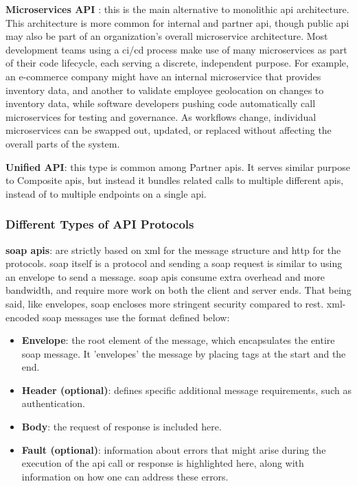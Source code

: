 \begin{multicols}{2}
      \textbf{Microservices API} \label{microservicesapi}: this is the main alternative to monolithic \acrshort{api}
      architecture. This architecture is more common for internal and partner \acrshort{api}, though public \acrshort{api}
      may also be part of an organization's overall microservice architecture. Most development teams using a
      \acrshort{ci}/\acrshort{cd} process make use of many microservices as part of their code lifecycle, each serving a
      discrete, independent purpose. For example, an e-commerce company might have an internal microservice that
      provides inventory data, and another to validate employee geolocation on changes to inventory data, while
      software developers pushing code automatically call microservices for testing and governance. As workflows
      change, individual microservices can be swapped out, updated, or replaced without affecting the overall parts
      of the system.

      \textbf{Unified API}: this type is common among Partner \acrshort{api}s. It serves similar purpose to Composite
      \acrshort{api}s, but instead it bundles related calls to multiple different \acrshort{api}s, instead of to multiple
      endpoints on a single \acrshort{api}.

      \subsubsection{Different Types of API Protocols}\label{chap:typesofapis}
      \textbf{\acrshort{soap} \acrshort{api}s}: are strictly based on \acrshort{xml} for the message structure and
      \acrshort{http} for the protocols. \acrshort{soap} itself is a protocol and sending a \acrshort{soap}
      request is similar to using an envelope to send a message. \acrshort{soap} \acrshort{api}s consume extra
      overhead and more bandwidth, and require more work on both the client and server ends. That being said,
      like envelopes, \acrshort{soap} encloses more stringent security compared to \acrshort{rest}. \acrshort{xml}-encoded
      \acrshort{soap} messages use the format defined below:
      \begin{itemize}
            \item \textbf{Envelope}: the root element of the message, which encapsulates the entire
                  \acrshort{soap} message. It 'envelopes' the message by placing tags at the start and the end.
            \item \textbf{Header (optional)}: defines specific additional message requirements, such as authentication.
            \item \textbf{Body}: the request of response is included here.
            \item \textbf{Fault (optional)}: information about errors that might arise during the execution of the
                  \acrshort{api} call or response is highlighted here, along with information on how one can address
                  these errors.
      \end{itemize}
\end{multicols}

